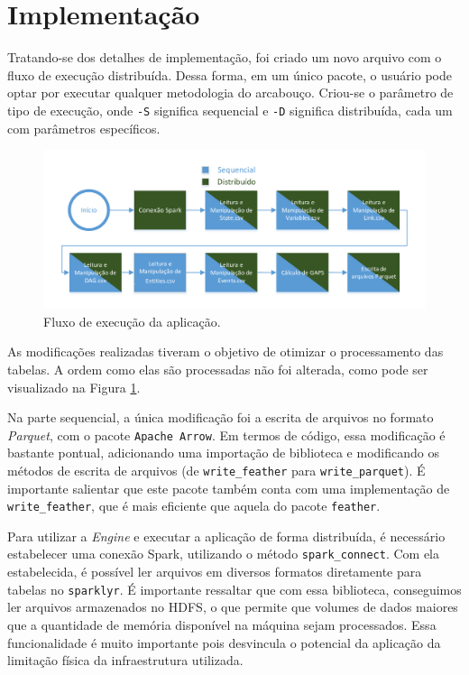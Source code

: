 \section{Implementação} \label{sect:implement}

Tratando-se dos detalhes de implementação, foi criado um novo arquivo com o 
fluxo de execução distribuída. Dessa forma, em um único pacote, o usuário pode 
optar por executar qualquer metodologia do arcabouço. Criou-se o parâmetro de 
tipo de execução, onde \texttt{-S} significa sequencial e \texttt{-D} significa 
distribuída, cada um com parâmetros específicos.

\begin{figure}[ht]
 \centerline{\includegraphics[width=1\textwidth]{./img/applicationflow.pdf}}
 \caption{Fluxo de execução da aplicação.}
 \label{fig:spark-starvz-flow}
\end{figure}

As modificações realizadas tiveram o objetivo de otimizar o processamento das 
tabelas. A ordem como elas são processadas não foi alterada, como pode ser 
visualizado na Figura \ref{fig:spark-starvz-flow}.

Na parte sequencial, a única modificação foi a escrita de arquivos no formato 
\textit{Parquet}, com o pacote \texttt{Apache Arrow}. Em termos de código, essa 
modificação é bastante pontual, adicionando uma importação de biblioteca e 
modificando os métodos de escrita de arquivos (de \texttt{write\_feather} 
para \texttt{write\_parquet}). É importante salientar que este pacote também 
conta com uma implementação de \texttt{write\_feather}, que é mais eficiente 
que aquela do pacote \texttt{feather}.

Para utilizar a \textit{Engine} e executar a aplicação de forma distribuída, é 
necessário estabelecer uma conexão Spark, utilizando o método 
\texttt{spark\_connect}. Com ela estabelecida, é possível ler arquivos em 
diversos formatos diretamente para tabelas no \texttt{sparklyr}. É importante 
ressaltar que com essa biblioteca, conseguimos ler arquivos armazenados no HDFS, 
o que permite que volumes de dados maiores que a quantidade de memória 
disponível na máquina sejam processados. Essa funcionalidade é muito importante 
pois desvincula o potencial da aplicação da limitação física da infraestrutura 
utilizada.

